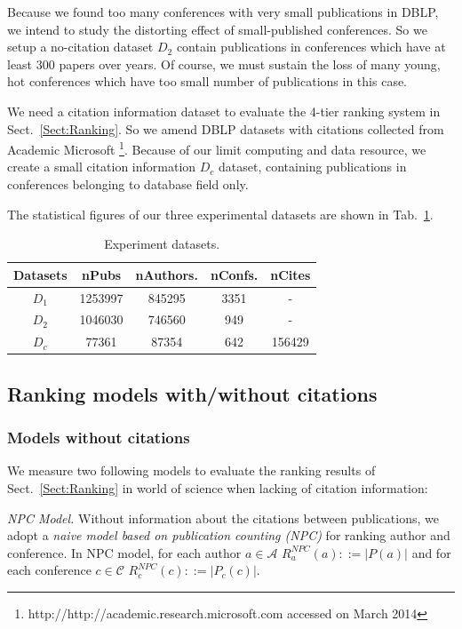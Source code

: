 \documentclass[10pt,leqno,twoside]{article}
\begin{document}
Because we found too many conferences with very small publications in DBLP, we intend to study the distorting effect of small-published conferences. So we setup a   
no-citation dataset $D_2$ contain publications in conferences which have at least 300 papers over years. Of course, we must sustain the loss of many young, hot conferences which have too small number of publications in this case. 

We need a citation information dataset to evaluate the 4-tier ranking system in Sect.~\ref{Sect:Ranking}. So we amend DBLP datasets with citations collected from Academic Microsoft \footnote{http://http://academic.research.microsoft.com accessed on March 2014}. 
Because of our limit computing and data resource, we create a small citation information $D_c$ dataset, containing publications in conferences belonging to database field only.

The statistical figures of our three experimental datasets are shown in Tab.~\ref{Tab:Dataset}.

\begin{center}
\begin{table}
	\centering
	\caption{Experiment datasets.}
    \label{Tab:Dataset}
    \begin{tabular}{|c|c|c|c|c|}
    \hline
    \textbf{Datasets} & \textbf{nPubs} & \textbf{nAuthors. } & \textbf{nConfs.} & \textbf{nCites} \\ \hline
   $D_1$ & 1253997 & 845295 & 3351 & - \\
   $D_2$ & 1046030 & 746560 & 949 & - \\
   $D_c$ & 77361 & 87354 & 642 & 156429 \\
    \hline
    \end{tabular}
\end{table}
\end{center}

\subsection{Ranking models with/without citations}\label{Sect:Measure}
\subsubsection{Models without citations}
We measure two following models to evaluate the ranking results of Sect.~\ref{Sect:Ranking} in world of science when lacking of citation information:

\textit{NPC Model.} Without information about the citations between publications, we adopt a \textit{naive model based on publication counting (NPC)} for ranking author and conference. In NPC model, for each author $a \in \mathcal{A}$  $R^{NPC}_a(a) ::= |P(a)| $ and for each conference $c \in \mathcal{C}$  $R^{NPC}_c(c) ::= |P_c(c)|$.
\end{document}
